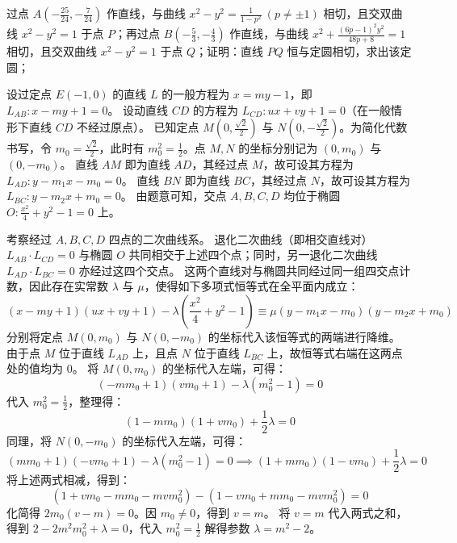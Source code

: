 \begin{example}
过点 \(A\left(-\frac{25}{24}, -\frac{7}{24}\right)\) 作直线，与曲线 \(x^2 - y^2 = \frac{1}{1 - p^2}\ (p \neq \pm 1)\) 相切，且交双曲线 \(x^2 - y^2 = 1\) 于点 \(P\)；再过点 \(B\left(-\frac{5}{3}, -\frac{4}{3}\right)\) 作直线，与曲线 \(x^2 + \frac{(6p - 1)^2 y^2}{48p + 8} = 1\) 相切，且交双曲线 \(x^2 - y^2 = 1\) 于点 \(Q\)；证明：直线 \(PQ\) 恒与定圆相切，求出该定圆；
\end{example}
\begin{solution}
设过定点 $E(-1,0)$ 的直线 $L$ 的一般方程为 $x = my - 1$，即 $L_{AB}: x - my + 1 = 0$。
设动直线 $CD$ 的方程为 $L_{CD}: ux + vy + 1 = 0$（在一般情形下直线 $CD$ 不经过原点）。
已知定点 $M\left(0, \frac{\sqrt{2}}{2}\right)$ 与 $N\left(0, -\frac{\sqrt{2}}{2}\right)$。为简化代数书写，令 $m_0 = \frac{\sqrt{2}}{2}$，此时有 $m_0^2 = \frac{1}{2}$。点 $M, N$ 的坐标分别记为 $(0, m_0)$ 与 $(0, -m_0)$。
直线 $AM$ 即为直线 $AD$，其经过点 $M$，故可设其方程为 $L_{AD}: y - m_1 x - m_0 = 0$。
直线 $BN$ 即为直线 $BC$，其经过点 $N$，故可设其方程为 $L_{BC}: y - m_2 x + m_0 = 0$。
由题意可知，交点 $A, B, C, D$ 均位于椭圆 $O: \frac{x^2}{4} + y^2 - 1 = 0$ 上。

考察经过 $A, B, C, D$ 四点的二次曲线系。
退化二次曲线（即相交直线对） $L_{AB} \cdot L_{CD} = 0$ 与椭圆 $O$ 共同相交于上述四个点；同时，另一退化二次曲线 $L_{AD} \cdot L_{BC} = 0$ 亦经过这四个交点。
这两个直线对与椭圆共同经过同一组四交点计数，因此存在实常数 $\lambda$ 与 $\mu$，使得如下多项式恒等式在全平面内成立：
$$ (x - my + 1)(ux + vy + 1) - \lambda\left(\frac{x^2}{4} + y^2 - 1\right) \equiv \mu(y - m_1 x - m_0)(y - m_2 x + m_0) $$
分别将定点 $M(0, m_0)$ 与 $N(0, -m_0)$ 的坐标代入该恒等式的两端进行降维。
由于点 $M$ 位于直线 $L_{AD}$ 上，且点 $N$ 位于直线 $L_{BC}$ 上，故恒等式右端在这两点处的值均为 $0$。
将 $M(0, m_0)$ 的坐标代入左端，可得：
$$ (-m m_0 + 1)(v m_0 + 1) - \lambda(m_0^2 - 1) = 0 $$
代入 $m_0^2 = \frac{1}{2}$，整理得：
$$ (1 - m m_0)(1 + v m_0) + \frac{1}{2}\lambda = 0 $$
同理，将 $N(0, -m_0)$ 的坐标代入左端，可得：
$$ (m m_0 + 1)(-v m_0 + 1) - \lambda(m_0^2 - 1) = 0 \implies (1 + m m_0)(1 - v m_0) + \frac{1}{2}\lambda = 0 $$
将上述两式相减，得到：
$$ (1 + v m_0 - m m_0 - m v m_0^2) - (1 - v m_0 + m m_0 - m v m_0^2) = 0 $$
化简得 $2m_0(v - m) = 0$。因 $m_0 \neq 0$，得到 $v = m$。
将 $v = m$ 代入两式之和，得到 $2 - 2m^2 m_0^2 + \lambda = 0$，代入 $m_0^2 = \frac{1}{2}$ 解得参数 $\lambda = m^2 - 2$。


\end{solution}
